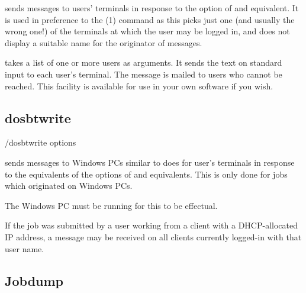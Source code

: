  sends messages to users' terminals in response to the  option of
\PrBtr{} and equivalent. It is used in preference to the (1) command as this picks just one (and
usually the wrong one!) of the terminals at which the user may be logged in, and does not display a suitable name for the originator of
messages.

 takes a list of one or more users as arguments. It sends the text on standard input to each
user's terminal. The message is mailed to users who cannot be reached. This facility is available for use in your own
software if you wish.


\subsection{dosbtwrite}

\begin{expara}

\progsdirname/dosbtwrite options

\end{expara}

 sends messages to Windows PCs similar to  does for user's terminals in response to the equivalents of the
 options of \PrBtr{} and equivalents. This is only done for jobs which originated on Windows PCs.

The Windows PC must be running  for this to be effectual.

If the job was submitted by a user working from a client with a DHCP-allocated IP address, a message may be received on all clients
currently logged-in with that user name.


\subsection{Jobdump}

